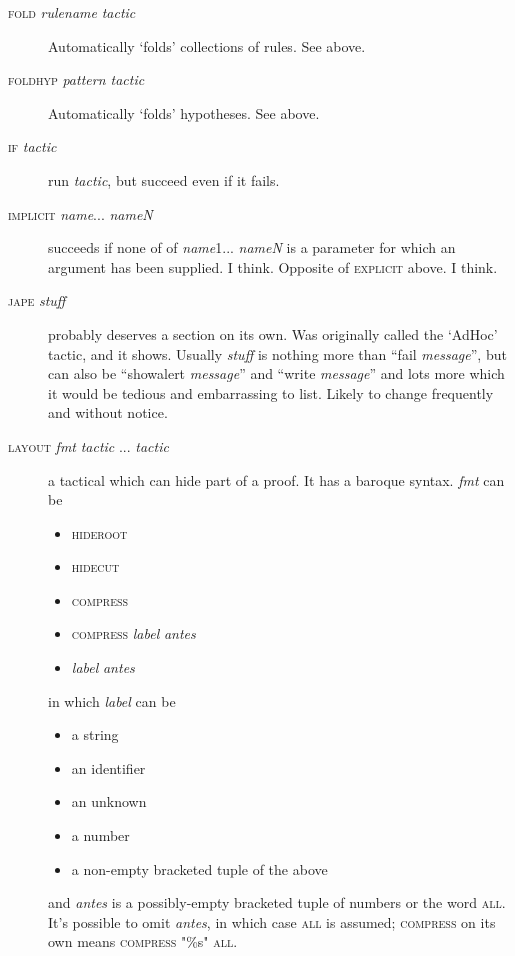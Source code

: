 \begin{description}
\item [\textsc{fold} \textit{rulename} \textit{tactic}] Automatically `folds' collections of rules. See  above.\\
\item [\textsc{foldhyp} \textit{pattern tactic}] Automatically `folds' hypotheses. See  above.\\
\item [\textsc{if} \textit{tactic}] run \textit{tactic}, but succeed even if it fails.


\item [\textsc{implicit} \textit{name}... \textit{nameN}] succeeds if none of of \textit{name}1... \textit{nameN} is a parameter for which an argument has been supplied. I think. Opposite of \textsc{explicit} above. I think.


\item [\textsc{jape} \textit{stuff} ] probably deserves a section on its own. Was originally called the `AdHoc' tactic, and it shows. Usually \textit{stuff} is nothing more than ``fail \textit{message}'', but can also be ``showalert \textit{message}'' and ``write \textit{message}'' and lots more which it would be tedious and embarrassing to list. Likely to change frequently and without notice.


\item [\textsc{layout} \textit{fmt} \textit{tactic} ... \textit{tactic}] a tactical which can hide part of a proof. It has a baroque syntax. \textit{fmt} can be 
\begin{itemize}
\item \textsc{hideroot}
\item \textsc{hidecut} 
\item \textsc{compress}
\item \textsc{compress} \textit{label} \textit{antes}
\item \textit{label} \textit{antes}
\end{itemize}
in which \textit{label} can be \begin{itemize}
\item a string
\item an identifier
\item an unknown
\item a number 
\item a non-empty bracketed tuple of the above
\end{itemize}
and \textit{antes} is a possibly-empty bracketed tuple of numbers or the word \textsc{all}. It's possible to omit \textit{antes}, in which case \textsc{all} is assumed; \textsc{compress} on its own means \textsc{compress} "\%s" \textsc{all}.


\end{description}
